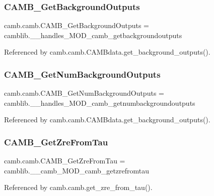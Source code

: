 \subsubsection{\texorpdfstring{C\+A\+M\+B\+\_\+\+Get\+Background\+Outputs}{CAMB\_GetBackgroundOutputs}}
{\footnotesize\ttfamily camb.\+camb.\+C\+A\+M\+B\+\_\+\+Get\+Background\+Outputs = camblib.\+\_\+\+\_\+handles\+\_\+\+M\+O\+D\+\_\+camb\+\_\+getbackgroundoutputs}



Referenced by camb.\+camb.\+C\+A\+M\+Bdata.\+get\+\_\+background\+\_\+outputs().

\mbox{\label{namespacecamb_1_1camb_aa431a5cd751bd35f7a2c43709be691ad}} 
\subsubsection{\texorpdfstring{C\+A\+M\+B\+\_\+\+Get\+Num\+Background\+Outputs}{CAMB\_GetNumBackgroundOutputs}}
{\footnotesize\ttfamily camb.\+camb.\+C\+A\+M\+B\+\_\+\+Get\+Num\+Background\+Outputs = camblib.\+\_\+\+\_\+handles\+\_\+\+M\+O\+D\+\_\+camb\+\_\+getnumbackgroundoutputs}



Referenced by camb.\+camb.\+C\+A\+M\+Bdata.\+get\+\_\+background\+\_\+outputs().

\mbox{\label{namespacecamb_1_1camb_ae0fae3fa009c3c9a5f8c6b337b82680e}} 
\subsubsection{\texorpdfstring{C\+A\+M\+B\+\_\+\+Get\+Zre\+From\+Tau}{CAMB\_GetZreFromTau}}
{\footnotesize\ttfamily camb.\+camb.\+C\+A\+M\+B\+\_\+\+Get\+Zre\+From\+Tau = camblib.\+\_\+\+\_\+camb\+\_\+\+M\+O\+D\+\_\+camb\+\_\+getzrefromtau}



Referenced by camb.\+camb.\+get\+\_\+zre\+\_\+from\+\_\+tau().

